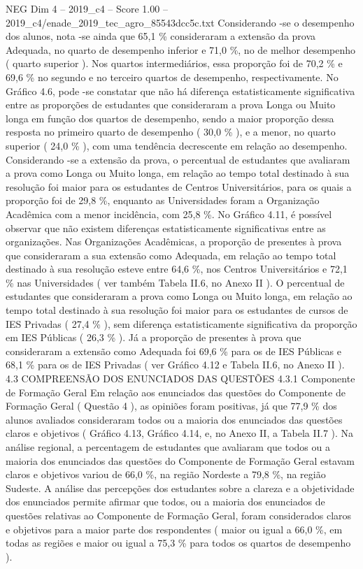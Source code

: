 \begin{textsample}{NEG Dim 4 – 2019\_c4 – Score 1.00 – 2019\_c4/enade\_2019\_tec\_agro\_85543dcc5c.txt}
Considerando -se o desempenho dos alunos, nota -se ainda que 65,1 \% consideraram a extensão da prova Adequada, no quarto de desempenho inferior e 71,0 \%, no de melhor desempenho ( quarto superior ).
Nos quartos intermediários, essa proporção foi de 70,2 \% e 69,6 \% no segundo e no terceiro quartos de desempenho, respectivamente.
No Gráfico 4.6, pode -se constatar que não há diferença estatisticamente significativa entre as proporções de estudantes que consideraram a prova Longa ou Muito longa em função dos quartos de desempenho, sendo a maior proporção dessa resposta no primeiro quarto de desempenho ( 30,0 \% ), e a menor, no quarto superior ( 24,0 \% ), com uma tendência decrescente em relação ao desempenho.
Considerando -se a extensão da prova, o percentual de estudantes que avaliaram a prova como Longa ou Muito longa, em relação ao tempo total destinado à sua resolução foi maior para os estudantes de Centros Universitários, para os quais a proporção foi de 29,8 \%, enquanto as Universidades foram a Organização Acadêmica com a menor incidência, com 25,8 \%.
No Gráfico 4.11, é possível observar que não existem diferenças estatisticamente significativas entre as organizações.
Nas Organizações Acadêmicas, a proporção de presentes à prova que consideraram a sua extensão como Adequada, em relação ao tempo total destinado à sua resolução esteve entre 64,6 \%, nos Centros Universitários e 72,1 \% nas Universidades ( ver também Tabela II.6, no Anexo II ).
O percentual de estudantes que consideraram a prova como Longa ou Muito longa, em relação ao tempo total destinado à sua resolução foi maior para os estudantes de cursos de IES Privadas ( 27,4 \% ), sem diferença estatisticamente significativa da proporção em IES Públicas ( 26,3 \% ).
Já a proporção de presentes à prova que consideraram a extensão como Adequada foi 69,6 \% para os de IES Públicas e 68,1 \% para os de IES Privadas ( ver Gráfico 4.12 e Tabela II.6, no Anexo II ). 4.3 COMPREENSÃO DOS ENUNCIADOS DAS QUESTÕES 4.3.1 Componente de Formação Geral Em relação aos enunciados das questões do Componente de Formação Geral ( Questão 4 ), as opiniões foram positivas, já que 77,9 \% dos alunos avaliados consideraram todos ou a maioria dos enunciados das questões claros e objetivos ( Gráfico 4.13, Gráfico 4.14, e, no Anexo II, a Tabela II.7 ).
Na análise regional, a percentagem de estudantes que avaliaram que todos ou a maioria dos enunciados das questões do Componente de Formação Geral estavam claros e objetivos variou de 66,0 \%, na região Nordeste a 79,8 \%, na região Sudeste.
A análise das percepções dos estudantes sobre a clareza e a objetividade dos enunciados permite afirmar que todos, ou a maioria dos enunciados de questões relativas ao Componente de Formação Geral, foram considerados claros e objetivos para a maior parte dos respondentes ( maior ou igual a 66,0 \%, em todas as regiões e maior ou igual a 75,3 \% para todos os quartos de desempenho ).

\end{textsample}
